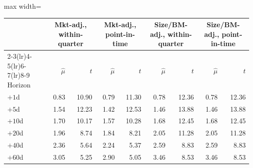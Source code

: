{\small
\begin{adjustbox}{max width=\linewidth}
\begin{tabular}{lrrrrrrrr}
\toprule
 & \multicolumn{2}{c}{Mkt-adj., within-quarter} & \multicolumn{2}{c}{Mkt-adj., point-in-time} & \multicolumn{2}{c}{Size/BM-adj., within-quarter} & \multicolumn{2}{c}{Size/BM-adj., point-in-time}\\
\cmidrule(lr){2-3}\cmidrule(lr){4-5}\cmidrule(lr){6-7}\cmidrule(lr){8-9}
Horizon & $\hat\mu$ & $t$ & $\hat\mu$ & $t$ & $\hat\mu$ & $t$ & $\hat\mu$ & $t$ \\
\midrule
$+1$d & 0.83 & 10.90 & 0.79 & 11.30 & 0.78 & 12.36 & 0.78 & 12.36 \\
$+5$d & 1.54 & 12.23 & 1.42 & 12.53 & 1.46 & 13.88 & 1.46 & 13.88 \\
$+10$d & 1.70 & 10.17 & 1.57 & 10.28 & 1.68 & 12.45 & 1.68 & 12.45 \\
$+20$d & 1.96 & 8.74 & 1.84 & 8.21 & 2.05 & 11.28 & 2.05 & 11.28 \\
$+40$d & 2.36 & 5.64 & 2.24 & 5.37 & 2.59 & 8.83 & 2.59 & 8.83 \\
$+60$d & 3.05 & 5.25 & 2.90 & 5.05 & 3.46 & 8.53 & 3.46 & 8.53 \\
\bottomrule
\end{tabular}
\end{adjustbox}
}
